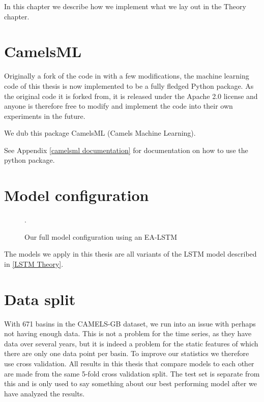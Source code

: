 In this chapter we describe how we implement what we lay out in the Theory chapter.
\section{CamelsML}
Originally a fork of the code in \cite{lstm_second_paper} with a few modifications, 
the machine learning code of this thesis is now implemented to be a fully fledged 
Python package. As the original code it is forked from, it is released under the 
Apache 2.0 license and anyone is therefore free to modify and implement the code 
into their own experiments in the future.

We dub this package CamelsML (Camels Machine Learning).


See Appendix \ref{camelsml documentation} for documentation on how to use the python 
package.

\section{Model configuration}
\begin{figure}
\caption{Our full model configuration using an EA-LSTM \cite{lstm_second_paper}}.
\end{figure}
The models we apply in this thesis are all variants of the LSTM model described 
in \ref{LSTM Theory}.
\section{Data split}
With 671 basins in the CAMELS-GB dataset, we run into an issue with perhaps not 
having enough data. This is not a problem for the time series, as they have data 
over several years, but it is indeed a problem for the static features of which there 
are only one data point per basin. To improve our statistics we therefore use 
cross validation. All results in this thesis that compare models to each other 
are made from the same 5-fold cross validation split. The test set is separate 
from this and is only used to say something about our best performing model after 
we have analyzed the results.

